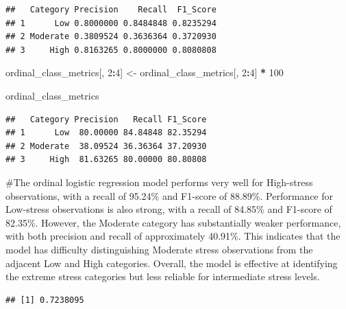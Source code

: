 \documentclass[
]{article}
\newenvironment{Shaded}{\begin{snugshade}}{\end{snugshade}}
\newcommand{\DecValTok}[1]{\textcolor[rgb]{0.00,0.00,0.81}{#1}}
\newcommand{\FunctionTok}[1]{\textcolor[rgb]{0.13,0.29,0.53}{\textbf{#1}}}
\newcommand{\NormalTok}[1]{#1}
\newcommand{\OtherTok}[1]{\textcolor[rgb]{0.56,0.35,0.01}{#1}}
\newcommand{\SpecialCharTok}[1]{\textcolor[rgb]{0.81,0.36,0.00}{\textbf{#1}}}
\begin{document}
\begin{verbatim}
##   Category Precision    Recall  F1_Score
## 1      Low 0.8000000 0.8484848 0.8235294
## 2 Moderate 0.3809524 0.3636364 0.3720930
## 3     High 0.8163265 0.8000000 0.8080808
\end{verbatim}

\begin{Shaded}
\begin{Highlighting}[]
\NormalTok{ordinal\_class\_metrics[, }\DecValTok{2}\SpecialCharTok{:}\DecValTok{4}\NormalTok{] }\OtherTok{\textless{}{-}}
\NormalTok{  ordinal\_class\_metrics[, }\DecValTok{2}\SpecialCharTok{:}\DecValTok{4}\NormalTok{] }\SpecialCharTok{*} \DecValTok{100}

\NormalTok{ordinal\_class\_metrics}
\end{Highlighting}
\end{Shaded}

\begin{verbatim}
##   Category Precision   Recall F1_Score
## 1      Low  80.00000 84.84848 82.35294
## 2 Moderate  38.09524 36.36364 37.20930
## 3     High  81.63265 80.00000 80.80808
\end{verbatim}

\#The ordinal logistic regression model performs very well for
High-stress observations, with a recall of 95.24\% and F1-score of
88.89\%. Performance for Low-stress observations is also strong, with a
recall of 84.85\% and F1-score of 82.35\%. However, the Moderate
category has substantially weaker performance, with both precision and
recall of approximately 40.91\%. This indicates that the model has
difficulty distinguishing Moderate stress observations from the adjacent
Low and High categories. Overall, the model is effective at identifying
the extreme stress categories but less reliable for intermediate stress
levels.

\begin{Shaded}
\end{Shaded}

\begin{verbatim}
## [1] 0.7238095
\end{verbatim}
\end{document}
